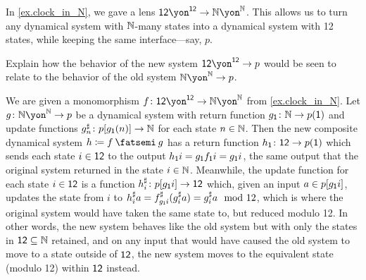 \documentclass[Book-Poly]{subfiles}
\begin{document}
\begin{exercise}
In \cref{ex.clock_in_N}, we gave a lens $\1\2\yon^{\1\2}\to\nn\yon^\nn$. This allows us to turn any dynamical system with $\mathbb{N}$-many states into a dynamical system with 12 states, while keeping the same interface---say, $p$.

Explain how the behavior of the new system $\1\2\yon^{\1\2}\to p$ would be seen to relate to the behavior of the old system $\nn\yon^\nn\to p$.
\begin{solution}
We are given a monomorphism $f \colon \1\2\yon^{\1\2} \to \nn\yon^\nn$ from \cref{ex.clock_in_N}.
Let $g \colon \nn\yon^\nn \to p$ be a dynamical system with return function $g_{\textsf{1}} \colon \mathbb{N} \to p(\textsf{1})$ and update functions $g^\sharp_n \colon p[g_{\textsf{1}}(n)] \to \mathbb{N}$ for each state $n \in \mathbb{N}$.
Then the new composite dynamical system $h \coloneqq f \then g$ has a return function $h_{\textsf{1}} \colon \textsf{1}\textsf{2} \to p(\textsf{1})$ which sends each state $i \in \textsf{1}\textsf{2}$ to the output $h_{\textsf{1}}i = g_{\textsf{1}}f_{\textsf{1}}i = g_{\textsf{1}}i$, the same output that the original system returned in the state $i \in \mathbb{N}$.
Meanwhile, the update function for each state $i \in \textsf{1}\textsf{2}$ is a function $h^\sharp_i \colon p[g_{\textsf{1}}i] \to \textsf{1}\textsf{2}$ which, given an input $a \in p[g_{\textsf{1}}i]$, updates the state from $i$ to $h^\sharp_ia = f^\sharp_{g_{\textsf{1}}i}(g^\sharp_ia) = g^\sharp_ia \mod 12$, which is where the original system would have taken the same state to, but reduced modulo 12.
In other words, the new system behaves like the old system but with only the states in $\textsf{1}\textsf{2} \subseteq \mathbb{N}$ retained, and on any input that would have caused the old system to move to a state outside of $\textsf{1}\textsf{2}$, the new system moves to the equivalent state (modulo 12) within $\textsf{1}\textsf{2}$ instead.
\end{solution}
\end{exercise}
\end{document}
